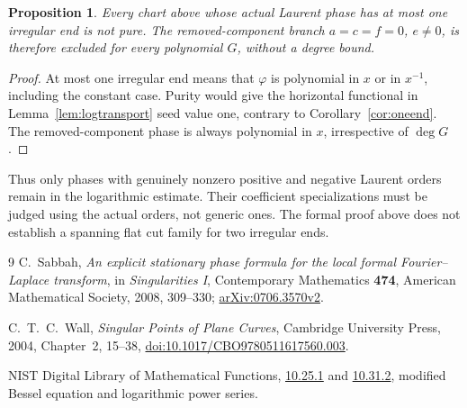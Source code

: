 \documentclass[11pt]{article}
\newtheorem{proposition}[theorem]{Proposition}
\theoremstyle{definition}\newtheorem{definition}[theorem]{Definition}
\theoremstyle{remark}\newtheorem{remark}[theorem]{Remark}
\begin{document}
\begin{proposition}\label{prop:oneendgaussian}
Every chart above whose actual Laurent phase has at most one
irregular end is not pure. The removed-component branch
$a=c=f=0$, $e\ne0$, is therefore excluded for every polynomial $G$,
without a degree bound.
\end{proposition}
\begin{proof}
At most one irregular end means that $\varphi$ is polynomial in
$x$ or in $x^{-1}$, including the constant case. Purity would give
the horizontal functional in Lemma~\ref{lem:logtransport} seed value
one, contrary to Corollary~\ref{cor:oneend}. The removed-component
phase is always polynomial in $x$, irrespective of $\deg G$.
\end{proof}

Thus only phases with genuinely nonzero positive and negative Laurent
orders remain in the logarithmic estimate. Their coefficient
specializations must be judged using the actual orders, not generic
ones. The formal proof above does not establish a spanning flat cut
family for two irregular ends.


\begin{thebibliography}{9}
C.~Sabbah, \emph{An explicit stationary phase formula for the local
formal Fourier--Laplace transform}, in \emph{Singularities I},
Contemporary Mathematics \textbf{474}, American Mathematical Society,
2008, 309--330;
\href{https://arxiv.org/abs/0706.3570v2}{arXiv:0706.3570v2}.

C.~T.~C.~Wall, \emph{Singular Points of Plane Curves}, Cambridge
University Press, 2004, Chapter~2, 15--38,
\href{https://doi.org/10.1017/CBO9780511617560.003}{doi:10.1017/CBO9780511617560.003}.

NIST Digital Library of Mathematical Functions,
\href{https://dlmf.nist.gov/10.25.E1}{10.25.1} and
\href{https://dlmf.nist.gov/10.31.E2}{10.31.2},
modified Bessel equation and logarithmic power series.

\end{thebibliography}
\end{document}
